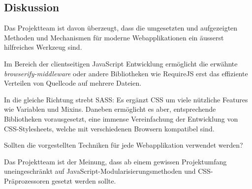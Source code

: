 \subsection*{Diskussion}
Das Projektteam ist davon überzeugt, dass die umgesetzten und aufgezeigten Methoden und Mechanismen für moderne Webapplikationen ein äusserst hilfreiches Werkzeug sind.

Im Bereich der clientseitigen JavaScript Entwicklung ermöglicht die erwähnte \emph{browserify-middleware} oder andere Bibliotheken wie RequireJS \cite{requirejs} erst das effiziente Verteilen von Quellcode auf mehrere Dateien.

In die gleiche Richtung strebt SASS: Es ergänzt CSS um viele nützliche Features wie Variablen und Mixins. Daneben ermöglicht es aber, entsprechende Bibliotheken vorausgesetzt, eine immense Vereinfachung der Entwicklung von CSS-Stylesheets, welche mit verschiedenen Browsern kompatibel sind.

Sollten die vorgestellten Techniken für jede Webapplikation verwendet werden?

Das Projektteam ist der Meinung, dass ab einem gewissen Projektumfang uneingeschränkt auf JavaScript-Modularisierungsmethoden und CSS-Präprozessoren gesetzt werden sollte.
